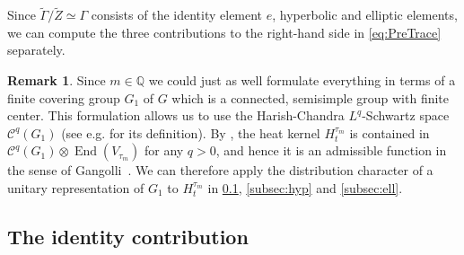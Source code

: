 \documentclass[10pt]{amsart}
\theoremstyle{plain}
\theoremstyle{definition}
\newtheorem{rmrk}[thm]{Remark}
\theoremstyle{remark}
\newcommand{\Q}{\mathbb{Q}}
\DeclareMathOperator{\End}{End}
\numberwithin{equation}{section}
\begin{document}
Since $\widetilde{\Gamma}/\widetilde{Z}\simeq\Gamma$ consists of the identity element $e$, hyperbolic and elliptic elements, we can compute the three contributions to the right-hand side in \cref{eq:PreTrace} separately.

\begin{rmrk}
Since $m\in\Q$ we could just as well formulate everything in terms of a finite covering group $G_1$ of $G$ which is a connected, semisimple group with finite center. This formulation allows us to use the Harish-Chandra $L^q$-Schwartz space $\mathcal{C}^q(G_1)$ (see e.g. \cite[p.\,161--162]{BM} for its definition). By \cite[Lem.\,2.3 and Prop.\,2.4]{BM}, the heat kernel $H_t^{\tau_m}$ is contained in $\mathcal{C}^q(G_1)\otimes\End(V_{\tau_m})$ for any $q>0$, and hence it is an admissible function in the sense of Gangolli~\cite[p.\,407]{gangolli1977}. We can therefore apply the distribution character of a unitary representation of $G_1$ to $H_t^{\tau_m}$ in \cref{subsec:id}, \cref{subsec:hyp} and \cref{subsec:ell}.
\end{rmrk}

\subsection{The identity contribution}
\label{subsec:id}
\end{document}
